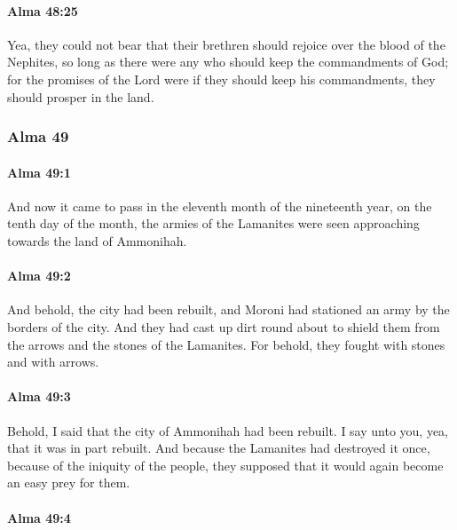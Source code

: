 		\paragraph{Alma 48:25} %
			\label{ALMA-48-25}

			Yea, they could not bear
			that their brethren should rejoice over the blood of the Nephites,
			so long as there were any who should keep the commandments of God;
			for the promises of the Lord were
			if they should keep his commandments,
			they should prosper in the land.

	\subsubsection{Alma 49} %
		\label{ALMA-49}
		
		\paragraph{Alma 49:1} %
			\label{ALMA-49-1}

			And now it came to pass in the eleventh month of the nineteenth year,
			on the tenth day of the month,
			the armies of the Lamanites were seen approaching
			towards the land of Ammonihah.

		\paragraph{Alma 49:2} %
			\label{ALMA-49-2}

			And behold, the city had been rebuilt,
			and Moroni had stationed an army by the borders of the city.
			And they had cast up dirt round about
			to shield them from the arrows and the stones of the Lamanites.
			For behold, they fought with stones and with arrows.

		\paragraph{Alma 49:3} %
			\label{ALMA-49-3}

			Behold, I said that the city of Ammonihah had been rebuilt.
			I say unto you, yea, that it was in part rebuilt.
			And because the Lamanites had destroyed it once,
			because of the iniquity of the people,
			they supposed that it would again become an easy prey for them.

		\paragraph{Alma 49:4} %
			\label{ALMA-49-4}

